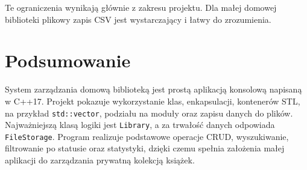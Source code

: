 \documentclass[12pt,a4paper]{article}
\begin{document}
Te ograniczenia wynikają głównie z zakresu projektu. Dla małej domowej biblioteki
plikowy zapis CSV jest wystarczający i łatwy do zrozumienia.

\section{Podsumowanie}

System zarządzania domową biblioteką jest prostą aplikacją konsolową napisaną w C++17.
Projekt pokazuje wykorzystanie klas, enkapsulacji, kontenerów STL, na przykład \texttt{std::vector}, podziału na moduły
oraz zapisu danych do plików. Najważniejszą klasą logiki jest \texttt{Library}, a za
trwałość danych odpowiada \texttt{FileStorage}. Program realizuje podstawowe operacje
CRUD, wyszukiwanie, filtrowanie po statusie oraz statystyki, dzięki czemu spełnia
założenia małej aplikacji do zarządzania prywatną kolekcją książek.
\end{document}
